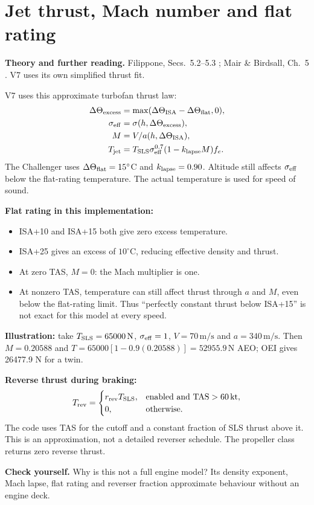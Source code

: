 \documentclass[11pt,letterpaper]{article}
\newcommand{\unit}[1]{\,\mathrm{#1}}
\newcommand{\topic}[1]{\clearpage\section{#1}}
\newcommand{\reading}[1]{{\small\color{navy}\textbf{Theory and further reading.} #1\par}\vspace{3pt}}
\newcommand{\selfcheck}[1]{\par\textbf{Check yourself.} #1\par}
\begin{document}
\topic{Jet thrust, Mach number and flat rating}
\reading{Filippone, Secs.~5.2--5.3 \cite{filippone}; Mair \& Birdsall, Ch.~5 \cite{mair}. V7 uses its own simplified thrust fit.}
V7 uses this approximate turbofan thrust law:
\begin{align*}
\Delta\Theta_{\rm excess}&=\max(\Delta\Theta_{\rm ISA}-\Delta\Theta_{\rm flat},0),\\
\sigma_{\rm eff}&=\sigma(h,\Delta\Theta_{\rm excess}),\\
M&=V/a(h,\Delta\Theta_{\rm ISA}),\\
T_{\rm jet}&=T_{\rm SLS}\sigma_{\rm eff}^{0.7}(1-k_{\rm lapse}M)f_e.
\end{align*}
The Challenger uses $\Delta\Theta_{\rm flat}=15^\circ$C and
$k_{\rm lapse}=0.90$. Altitude still affects $\sigma_{\rm eff}$ below the
flat-rating temperature. The actual temperature is used for speed of sound.

\textbf{Flat rating in this implementation:}
\begin{itemize}
\item ISA+10 and ISA+15 both give zero excess temperature.
\item ISA+25 gives an excess of $10^\circ$C, reducing effective density and thrust.
\item At zero TAS, $M=0$: the Mach multiplier is one.
\item At nonzero TAS, temperature can still affect thrust through $a$ and $M$,
even below the flat-rating limit. Thus ``perfectly constant thrust below ISA+15''
is not exact for this model at every speed.
\end{itemize}
\textbf{Illustration:} take $T_{\rm SLS}=65000\unit N$, $\sigma_{\rm eff}=1$,
$V=70\unit{m/s}$ and $a=340\unit{m/s}$. Then $M=0.20588$ and
$T=65000[1-0.9(0.20588)]=52955.9\unit N$ AEO; OEI gives 26477.9 N for a twin.

\textbf{Reverse thrust during braking:}
\[
T_{\rm rev}=\begin{cases}r_{\rm rev}T_{\rm SLS},&\text{enabled and TAS}>60\unit{kt},\\
0,&\text{otherwise}.\end{cases}
\]
The code uses TAS for the cutoff and a constant fraction of SLS thrust above it.
This is an approximation, not a detailed reverser schedule. The propeller class
returns zero reverse thrust.
\selfcheck{Why is this not a full engine model? Its density exponent, Mach lapse,
flat rating and reverser fraction approximate behaviour without an engine deck.}
\end{document}
